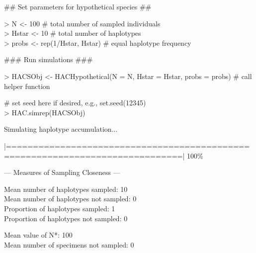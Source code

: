 {\tt \scriptsize

\vspace{2mm}

{\noindent \#\# Set parameters for hypothetical species \#\#}

\vspace{1mm}

{\noindent > N <- 100 \# total number of sampled individuals} \\
{> Hstar <- 10 \# total number of haplotypes} \\
{> probs <- rep(1/Hstar, Hstar) \# equal haplotype frequency}

\vspace{2mm}

{\noindent \#\#\# Run simulations \#\#\#}

\vspace{1mm}

{\noindent > HACSObj <- HACHypothetical(N = N, Hstar = Hstar, probs = probs) \# call helper function}

\vspace{1mm}

{\noindent \# set seed here if desired, e.g., set.seed(12345)} \\
{> HAC.simrep(HACSObj)} 

\noindent Simulating haplotype accumulation...

\vspace{2mm}
 
\noindent |==============================================================================| 100\%
  
\vspace{3mm}
 
\noindent --- Measures of Sampling Closeness ---

\vspace{2mm} 
 
\noindent Mean number of haplotypes sampled:  10 \\
Mean number of haplotypes not sampled:  0 \\
Proportion of haplotypes sampled:  1 \\
Proportion of haplotypes not sampled:  0

\vspace{2mm} 
 
\noindent Mean value of N*:  100 \\
Mean number of specimens not sampled:  0

\vspace{3mm}
 
}
